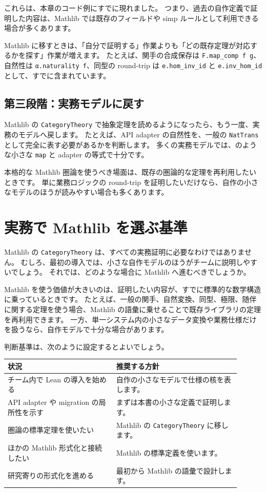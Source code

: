 これらは、本章のコード例にすでに現れました。
つまり、過去の自作定義で証明した内容は、Mathlib では既存のフィールドや simp ルールとして利用できる場合が多くあります。

Mathlib に移すときは、「自分で証明する」作業よりも「どの既存定理が対応するかを探す」作業が増えます。
たとえば、関手の合成保存は \texttt{F.map\_comp f g}、自然性は \texttt{α.naturality f}、同型の round-trip は \texttt{e.hom\_inv\_id} と \texttt{e.inv\_hom\_id} として、すでに含まれています。

\subsection{第三段階：実務モデルに戻す}

Mathlib の \texttt{CategoryTheory} で抽象定理を読めるようになったら、もう一度、実務のモデルへ戻します。
たとえば、API adapter の自然性を、一般の \texttt{NatTrans} として完全に表す必要があるかを判断します。
多くの実務モデルでは、のような小さな \texttt{map} と adapter の等式で十分です。

本格的な Mathlib 圏論を使うべき場面は、既存の圏論的な定理を再利用したいときです。
単に業務ロジックの round-trip を証明したいだけなら、自作の小さなモデルのほうが読みやすい場合も多くあります。

\section{実務で Mathlib を選ぶ基準}

Mathlib の \texttt{CategoryTheory} は、すべての実務証明に必要なわけではありません。
むしろ、最初の導入では、小さな自作モデルのほうがチームに説明しやすいでしょう。
それでは、どのような場合に Mathlib へ進むべきでしょうか。

Mathlib を使う価値が大きいのは、証明したい内容が、すでに標準的な数学構造に乗っているときです。
たとえば、一般の関手、自然変換、同型、極限、随伴に関する定理を使う場合、Mathlib の語彙に乗せることで既存ライブラリの定理を再利用できます。
一方、単一システム内の小さなデータ変換や業務仕様だけを扱うなら、自作モデルで十分な場合があります。

判断基準は、次のように設定するとよいでしょう。

\begin{longtable}{p{0.42\linewidth}p{0.48\linewidth}}
\toprule
状況 & 推奨する方針 \\
\midrule
チーム内で Lean の導入を始める & 自作の小さなモデルで仕様の核を表します。 \\
API adapter や migration の局所性を示す & まずは本書の小さな定義で証明します。 \\
圏論の標準定理を使いたい & Mathlib の \texttt{CategoryTheory} に移します。 \\
ほかの Mathlib 形式化と接続したい & Mathlib の標準定義を使います。 \\
研究寄りの形式化を進める & 最初から Mathlib の語彙で設計します。 \\
\bottomrule
\end{longtable}


